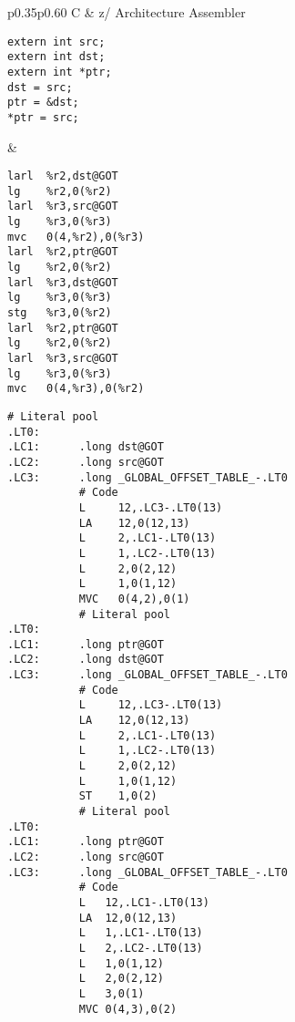 \documentclass[english,11pt,twoside,toc=bib,toc=idx]{scrreprt}
\newcommand{\ARCH}{z/\kern-1pt Ar\-chi\-tec\-ture}
\newcommand{\ARCH}{ESA/390}
\newenvironment{DIFnomarkup}{}{} %
\begin{document}
\begin{table}
  \centering
  \begin{DIFnomarkup}
  \begin{tabular}{p{}p{}}
    \toprule
    C & \ARCH{} Assembler \\
    \midrule
\begin{lstlisting}[style=short]
extern int src;
extern int dst;
extern int *ptr;
dst = src;
ptr = &dst;
*ptr = src;
\end{lstlisting}
    &
\ifzseries
\begin{lstlisting}[style=short,language=simpleasm]
larl  %r2,dst@GOT
lg    %r2,0(%r2)
larl  %r3,src@GOT
lg    %r3,0(%r3)
mvc   0(4,%r2),0(%r3)
larl  %r2,ptr@GOT
lg    %r2,0(%r2)
larl  %r3,dst@GOT
lg    %r3,0(%r3)
stg   %r3,0(%r2)
larl  %r2,ptr@GOT
lg    %r2,0(%r2)
larl  %r3,src@GOT
lg    %r3,0(%r3)
mvc   0(4,%r3),0(%r2)
\end{lstlisting}
\else
\begin{lstlisting}[style=short,language=simpleasm]
           # Literal pool
.LT0:
.LC1:      .long dst@GOT
.LC2:      .long src@GOT
.LC3:      .long _GLOBAL_OFFSET_TABLE_-.LT0
           # Code
           L     12,.LC3-.LT0(13)
           LA    12,0(12,13)
           L     2,.LC1-.LT0(13)
           L     1,.LC2-.LT0(13)
           L     2,0(2,12)
           L     1,0(1,12)
           MVC   0(4,2),0(1)
           # Literal pool
.LT0:
.LC1:      .long ptr@GOT
.LC2:      .long dst@GOT
.LC3:      .long _GLOBAL_OFFSET_TABLE_-.LT0
           # Code
           L     12,.LC3-.LT0(13)
           LA    12,0(12,13)
           L     2,.LC1-.LT0(13)
           L     1,.LC2-.LT0(13)
           L     2,0(2,12)
           L     1,0(1,12)
           ST    1,0(2)
           # Literal pool
.LT0:
.LC1:      .long ptr@GOT
.LC2:      .long src@GOT
.LC3:      .long _GLOBAL_OFFSET_TABLE_-.LT0
           # Code
           L   12,.LC1-.LT0(13)
           LA  12,0(12,13)
           L   1,.LC1-.LT0(13)
           L   2,.LC2-.LT0(13)
           L   1,0(1,12)
           L   2,0(2,12)
           L   3,0(1)
           MVC 0(4,3),0(2)
\end{lstlisting}
\fi \\
    \bottomrule
  \end{tabular}
  \end{DIFnomarkup}
  \caption{Large model position-independent addressing}
  \label{tab:largegot}
\end{table}
\end{document}
